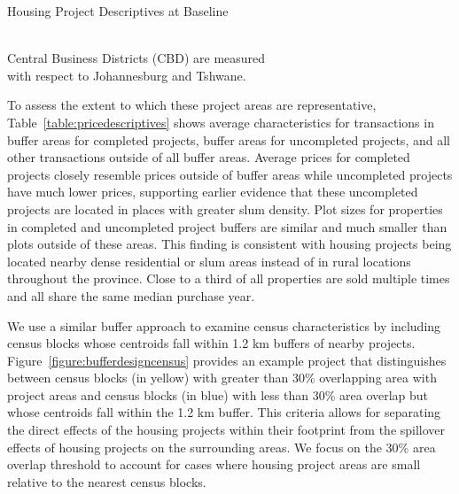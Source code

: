 \documentclass[12pt]{article}
\begin{document}
\begin{table}
	\centering
	\caption{Housing Project Descriptives at Baseline}\label{table:projectdescriptivescensus}
%
 \\
\vspace{.2cm}
\footnotesize{Central Business Districts (CBD) are measured \\
with respect to Johannesburg and Tshwane.}
\end{table}

To assess the extent to which these project areas are representative, Table~\ref{table:pricedescriptives} shows average characteristics for transactions in buffer areas for completed projects, buffer areas for uncompleted projects, and all other transactions outside of all buffer areas.  Average prices for completed projects closely resemble prices outside of buffer areas while uncompleted projects have much lower prices, supporting earlier evidence that these uncompleted projects are located in places with greater slum density.  Plot sizes for properties in completed and uncompleted project buffers are similar and much smaller than plots outside of these areas.  This finding is consistent with housing projects being located nearby dense residential or slum areas instead of in rural locations throughout the province.  Close to a third of all properties are sold multiple times and all share the same median purchase year.


We use a similar buffer approach to examine census characteristics by including census blocks whose centroids fall within 1.2 km buffers of nearby projects.  Figure~\ref{figure:bufferdesigncensus} provides an example project that distinguishes between census blocks (in yellow) with greater than 30\% overlapping area with project areas and census blocks (in blue) with less than 30\% area overlap but whose centroids fall within the 1.2 km buffer.  This criteria allows for separating the direct effects of the housing projects within their footprint from the spillover effects of housing projects on the surrounding areas.  We focus on the 30\% area overlap threshold to account for cases where housing project areas are small relative to the nearest census blocks.
\end{document}
